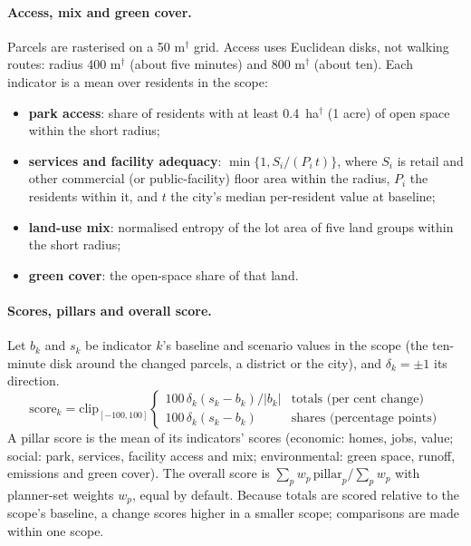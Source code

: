 \documentclass[10pt]{article}
\begin{document}
\paragraph{Access, mix and green cover.} Parcels are rasterised on a 50 m$^\dagger$ grid. Access uses
Euclidean disks, not walking routes: radius 400 m$^\dagger$ (about five minutes) and 800 m$^\dagger$ (about
ten). Each indicator is a mean over residents in the scope:
\begin{itemize}
\item \textbf{park access}: share of residents with at least 0.4~ha$^\dagger$ (1 acre) of open space within the
short radius;
\item \textbf{services and facility adequacy}: $\min\{1, S_i/(P_i\,t)\}$, where $S_i$ is retail and other commercial
(or public-facility) floor area within the radius, $P_i$ the residents within it, and $t$ the city's median per-resident
value at baseline;
\item \textbf{land-use mix}: normalised entropy of the lot area of five land groups within the short radius;
\item \textbf{green cover}: the open-space share of that land.
\end{itemize}

\paragraph{Scores, pillars and overall score.} Let $b_k$ and $s_k$ be indicator $k$'s baseline and scenario values in the
scope (the ten-minute disk around the changed parcels, a district or the city), and $\delta_k = \pm 1$ its direction.
\begin{equation}
\mathrm{score}_k = \mathrm{clip}_{[-100,100]}\begin{cases} 100\,\delta_k (s_k - b_k)/|b_k| & \text{totals (per cent change)}\\
100\,\delta_k (s_k - b_k) & \text{shares (percentage points)} \end{cases}
\end{equation}
A pillar score is the mean of its indicators' scores (economic: homes, jobs, value; social: park, services, facility
access and mix; environmental: green space, runoff, emissions and green cover). The overall score is
$\sum_p w_p\,\mathrm{pillar}_p / \sum_p w_p$ with planner-set weights $w_p$, equal by default. Because totals are scored
relative to the scope's baseline, a change scores higher in a smaller scope; comparisons are made within one scope.
\end{document}
